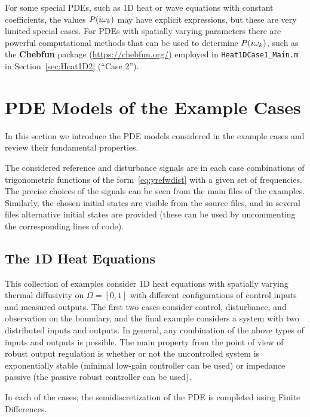 \documentclass[11pt, a4paper]{amsart}
\theoremstyle{definition}
\numberwithin{equation}{section}
\begin{document}
For some special PDEs, such as 1D heat or wave equations with constant coefficients, the values $P(i\omega_k)$ may have explicit expressions, but these are very limited special cases. For PDEs with spatially varying parameters there are powerful computational methods that can be used to determine $P(i\omega_k)$, such as the \textbf{Chebfun} package (\href{https://chebfun.org/}{https://chebfun.org/}) employed in \texttt{Heat1DCase1\_Main.m} in Section~\ref{sec:Heat1D2} (``Case 2'').



\section{PDE Models of the Example Cases}
\label{sec:PDEcases}

In this section we introduce the PDE models considered in the example cases and review their fundamental properties.

The considered reference and disturbance signals are in each case combinations of trigonometric functions of the form~\eqref{eq:yrefwdist} with a given set of frequencies. The precise choices of the signals can be seen from the main files of the examples. Similarly, the chosen initial states are visible from the source files, and in several files alternative initial states are provided (these can be used by uncommenting the corresponding lines of code).

\subsection{The 1D Heat Equations}

This collection of examples consider 1D heat equations with spatially varying thermal diffusivity on $\Omega = [0,1]$ with different configurations of control inputs and measured outputs. The first two cases consider control, disturbance, and observation on the boundary, and the final example considers a system with two distributed inputs and outputs. In general, any combination of the above types of inputs and outputs is possible. 
The main property from the point of view of robust output regulation is whether or not the uncontrolled system is exponentially stable (minimal low-gain controller can be used) or impedance passive (the passive robust controller can be used).

In each of the cases, the semidiscretization of the PDE is completed using Finite Differences.

\medskip
\end{document}
